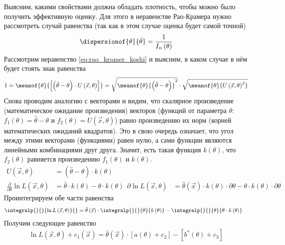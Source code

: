 Выясним, какими свойствами должна обладать плотность,
чтобы можно было получить эффективную оценку.
Для этого в неравенстве Рао-Крамера нужно рассмотреть случай равенства
(так как в этом случае оценка будет самой точной)
\begin{equation*}
  \dispersionof{\theta}{\hat{\theta}}= \frac{1}{I_n\left(\theta\right)}
\end{equation*}
Рассмотрим неравенство \eqref{eq:rao_kramer_koshi} и выясним,
в каком случае в нём будет стоять знак равенства
\begin{equation*}
  1
  = \meanof{\theta}{
    \left[\left( \hat{\theta} - \theta \right)
      \cdot U\left( \vec{x}, \theta \right)\right]}
  = \sqrt{\meanof{\theta}{
    \left(\hat{\theta}-\theta\right)}^2}
    \cdot \sqrt{\meanof{\theta}{U\left( \vec{x}, \theta \right)^2}}
\end{equation*}
Снова проводим аналогию с векторами и видим,
что скалярное произведение (математическое ожидание произведения)
векторов
(функций от параметра $\theta$:
$f_1\left( \theta \right)= \hat{\theta}-\theta$ и
$f_2\left( \theta \right)=U\left( \vec{x},\theta \right)$)
равно произведению их норм (корней математических ожиданий квадратов).
Это в свою очередь означает,
что угол между этими векторами (функциями) равен нулю,
а сами функции являются линейными комбинациями друг друга.
Значит, есть такая функция $k\left( \theta \right)$, что
$f_2\left( \theta \right)$ равняется произведению
$f_1\left( \theta \right)$ и $k\left( \theta \right)$.
\begin{align*}
  U\left( \vec{x},\theta \right)
    &= \left( \hat{\theta}-\theta \right)\cdot k\left( \theta \right)\\
  \frac{\partial}{\partial\theta}\ln{L\left( \vec{x},\theta \right)}
    &= \hat{\theta}\cdot k\left( \theta \right)
      -\theta\cdot k\left( \theta \right)\ \
  \partial\ln{L\left( \vec{x},\theta \right)}
    &= \hat{\theta}\left( \vec{x} \right)
        \cdot k\left( \theta \right)\cdot\partial\theta
      -\theta\cdot k\left( \theta \right)\cdot\partial\theta
\end{align*}
Проинтегрируем обе части равенства
\begin{align*}
  \integralp{}{}{\ln{L\left( \vec{x},\theta \right)}}{}
    &= \hat{\theta}\left( \vec{x} \right)
        \cdot \integralp{}{}{\theta}{k\left( \theta \right)}
      -\integralp{}{}{\theta}{\theta\cdot k\left( \theta \right)}
\end{align*}
Получим следующее равенство
\begin{align*}
  \ln{L\left( \vec{x},\theta \right)}+c_1\left( \vec{x} \right)
    = \hat{\theta}\left( \vec{x} \right)
        \cdot \left[ a\left( \theta \right)+c_2\right]
      -\left[b^*\left( \theta \right)+c_3\right]
\end{align*}
